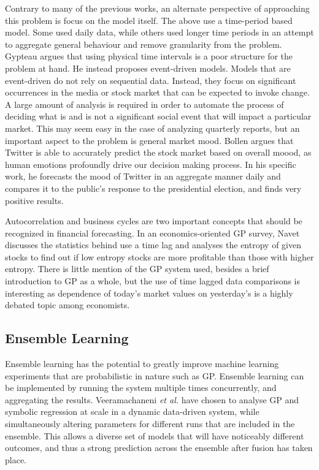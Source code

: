 \documentclass[12pt, letterpaper]{article}
\begin{document}
\textrm{ \indent Contrary to many of the previous works, an alternate perspective of approaching this problem is focus on the model itself. The above use a time-period based model. Some used daily data, while others used longer time periods in an attempt to aggregate general behaviour and remove granularity from the problem. Gypteau \cite{gypteau} argues that using physical time intervals is a poor structure for the problem at hand. He instead proposes event-driven models. Models that are event-driven do not rely on sequential data. Instead, they focus on significant occurrences in the media or stock market that can be expected to invoke change. A large amount of analysis is required in order to automate the process of deciding what is and is not a significant social event that will impact a particular market. This may seem easy in the case of analyzing quarterly reports, but an important aspect to the problem is general market mood. Bollen \cite{twitter} argues that Twitter is able to accurately predict the stock market based on overall moood, as human emotions profoundly drive our decision making process. In his specific work, he forecasts the mood of Twitter in an aggregate manner daily and compares it to the public's response to the presidential election, and finds very positive results. } 

\textrm{ \indent Autocorrelation and business cycles are two important concepts that should be recognized in financial forecasting. In an economics-oriented GP survey, Navet \cite{navet} discusses the statistics behind use a time lag and analyses the entropy of given stocks to find out if low entropy stocks are more profitable than those with higher entropy. There is little mention of the GP system used, besides a brief introduction to GP as a whole, but the use of time lagged data comparisons is interesting as dependence of today's market values on yesterday's is a highly debated topic among economists. }

\subsection{Ensemble Learning}

\textrm{ \indent Ensemble learning has the potential to greatly improve machine learning experiments that are probabilistic in nature such as GP. Ensemble learning can be implemented by running the system multiple times concurrently, and aggregating the results. Veeramachaneni \textit{et al.} \cite{ensemble1} have chosen to analyse GP and symbolic regression at scale in a dynamic data-driven system, while simultaneously altering parameters for different runs that are included in the ensemble. This allows a diverse set of models that will have noticeably different outcomes, and thus a strong prediction across the ensemble after fusion has taken place. }
\end{document}
